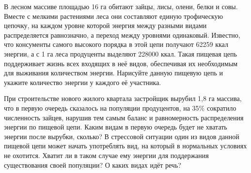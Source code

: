
В лесном массиве площадью 16 га обитают зайцы, лисы, олени, белки и совы. Вместе с мелкими растениями леса они 
составляют единую трофическую цепочку, на каждом уровне которой энергия между разными видами распределяется 
равнозначно, а переход между уровнями одинаковый. Известно, что консументы самого высокого порядка в этой цепи 
получают 62259 ккал энергии, а с 1 га леса продуценты выделяют 228000 ккал. Такая пищевая цепь поддерживает жизнь 
всех входящих в неё видов, обеспечивая их необходимым для выживания количеством энергии. Нарисуйте данную пищевую 
цепь и укажите количество энергии у каждого её участника.
 
При строительстве нового жилого квартала застройщик вырубил 1,8 га массива, что в первую очередь сказалось на 
популяции продуцентов, на 35\% сократило численность зайцев, нарушив тем самым баланс и равномерность 
распределения энергии по пищевой цепи. Каким видам в первую очередь будет не хватать энергии после вырубки, 
сколько? В стрессовой ситуации один из видов данной пищевой цепи может начать употреблять вид, на который в 
нормальных условиях не охотится. Хватит ли в таком случае ему энергии для поддержания существования своей 
популяции? О каких видах идёт речь?
